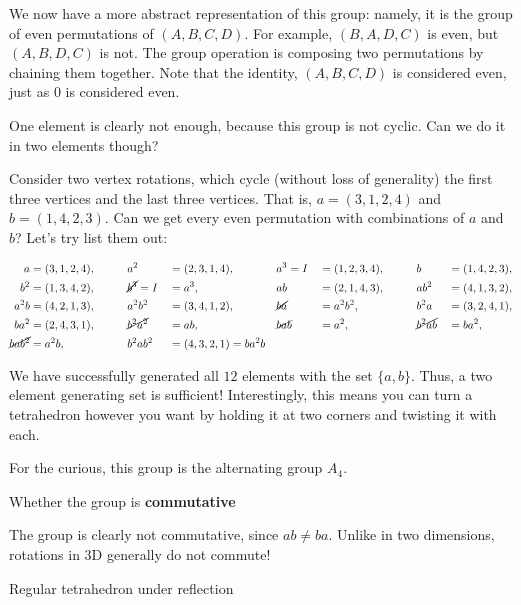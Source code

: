 \documentclass[../key.tex]{subfiles}
\begin{document}
\noindent We now have a more abstract representation of this group: namely, it is the group of even permutations of $(A,B,C,D)$. For example, $(B,A,D,C)$ is even, but $(A,B,D,C)$ is not. The group operation is composing two permutations by chaining them together. Note that the identity, $(A,B,C,D)$ is considered even, just as $0$ is considered even.

One element is clearly not enough, because this group is not cyclic. Can we do it in two elements though?

Consider two vertex rotations, which cycle (without loss of generality) the first three vertices and the last three vertices. That is, $a=(3,1,2,4)$ and $b=(1,4,2,3)$. Can we get every even permutation with combinations of $a$ and $b$? Let's try list them out:

\begin{alignat*}{9}
a &=(3,1,2,4), \qquad &&a^2&&=(2,3,1,4), \qquad &&a^3=I&&=(1,2,3,4), \qquad  &&b&&=(1,4,2,3), \\
b^2&=(1,3,4,2), &&\cancel{b^3}=I&&=a^3, &&ab&&=(2,1,4,3), &&ab^2&&=(4,1,3,2), \\
a^2b&=(4,2,1,3), &&a^2b^2&&=(3,4,1,2), &&\cancel{ba}&&=a^2b^2, &&b^2a&&=(3,2,4,1), \\
ba^2&=(2,4,3,1), &&\cancel{b^2a^2}&&=ab, &&\cancel{bab}&&=a^2, &&\cancel{b^2ab}&&=ba^2, \\
\cancel{bab^2}&=a^2b, &&b^2ab^2&&=(4,3,2,1)=ba^2b &&
\end{alignat*}

\noindent We have successfully generated all $12$ elements with the set $\{a,b\}$. Thus, a two element generating set is sufficient! Interestingly, this means you can turn a tetrahedron however you want by holding it at two corners and twisting it with each.

For the curious, this group is the alternating group $A_4$.

\begin{inner_problem}
\item Whether the group is \textbf{commutative}
\end{inner_problem}

\noindent The group is clearly not commutative, since $ab\neq ba$. Unlike in two dimensions, rotations in 3D generally do not commute!

\begin{outer_problem}
\item Regular tetrahedron under reflection
\end{outer_problem}
\end{document}
